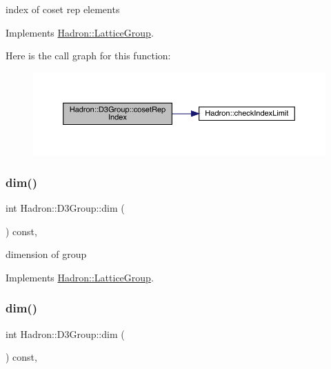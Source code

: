 index of coset rep elements 

Implements \mbox{\hyperlink{structHadron_1_1LatticeGroup_a7e3b9b5e2f596e6c40d64aa939a3ad6c}{Hadron\+::\+Lattice\+Group}}.

Here is the call graph for this function\+:
\nopagebreak
\begin{figure}[H]
\begin{center}
\leavevmode
\includegraphics[width=350pt]{de/de1/structHadron_1_1D3Group_a361cfe22330be972fe6d49bc2e1af871_cgraph}
\end{center}
\end{figure}
\mbox{\label{structHadron_1_1D3Group_a90114a92f0c05cdfd8ff56e33606d3c3}} 
\subsubsection{\texorpdfstring{dim()}{dim()}\hspace{0.1cm}{\footnotesize\ttfamily [1/2]}}
{\footnotesize\ttfamily int Hadron\+::\+D3\+Group\+::dim (\begin{DoxyParamCaption}{ }\end{DoxyParamCaption}) const\hspace{0.3cm}{\ttfamily [inline]}, {\ttfamily [virtual]}}

dimension of group 

Implements \mbox{\hyperlink{structHadron_1_1LatticeGroup_abd8415698323796ef6a8605796ee3bea}{Hadron\+::\+Lattice\+Group}}.

\mbox{\label{structHadron_1_1D3Group_a90114a92f0c05cdfd8ff56e33606d3c3}} 
\subsubsection{\texorpdfstring{dim()}{dim()}\hspace{0.1cm}{\footnotesize\ttfamily [2/2]}}
{\footnotesize\ttfamily int Hadron\+::\+D3\+Group\+::dim (\begin{DoxyParamCaption}{ }\end{DoxyParamCaption}) const\hspace{0.3cm}{\ttfamily [inline]}, {\ttfamily [virtual]}}

